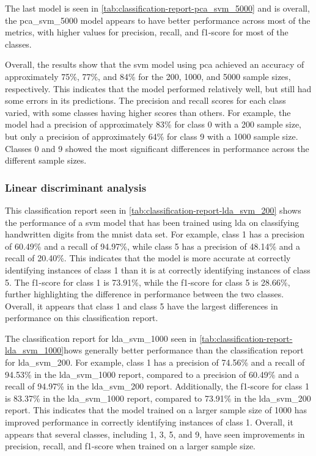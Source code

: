 The last model is seen in \autoref{tab:classification-report-pca_svm_5000} and is overall, the pca\_svm\_5000 model appears to have better performance across most of the metrics, with higher values for precision, recall, and f1-score for most of the classes.




Overall, the results show that the \gls{svm} model using \gls{pca} achieved an accuracy of approximately 75\%, 77\%, and 84\% for the 200, 1000, and 5000 sample sizes, respectively. This indicates that the model performed relatively well, but still had some errors in its predictions. The precision and recall scores for each class varied, with some classes having higher scores than others. For example, the model had a precision of approximately 83\% for class 0 with a 200 sample size, but only a precision of approximately 64\% for class 9 with a 1000 sample size. Classes 0 and 9 showed the most significant differences in performance across the different sample sizes.

\subsubsection{Linear discriminant analysis}\label{subsubsec:experiment_4_lda}




This classification report seen in \autoref{tab:classification-report-lda_svm_200} shows the performance of a \gls{svm} model that has been trained using \gls{lda} on classifying handwritten digits from the \gls{mnist} data set. For example, class 1 has a precision of 60.49\% and a recall of 94.97\%, while class 5 has a precision of 48.14\% and a recall of 20.40\%. This indicates that the model is more accurate at correctly identifying instances of class 1 than it is at correctly identifying instances of class 5. The f1-score for class 1 is 73.91\%, while the f1-score for class 5 is 28.66\%, further highlighting the difference in performance between the two classes. Overall, it appears that class 1 and class 5 have the largest differences in performance on this classification report.



The classification report for lda\_svm\_1000 seen in \autoref{tab:classification-report-lda_svm_1000}hows generally better performance than the classification report for lda\_svm\_200. For example, class 1 has a precision of 74.56\% and a recall of 94.53\% in the lda\_svm\_1000 report, compared to a precision of 60.49\% and a recall of 94.97\% in the lda\_svm\_200 report. Additionally, the f1-score for class 1 is 83.37\% in the lda\_svm\_1000 report, compared to 73.91\% in the lda\_svm\_200 report. This indicates that the model trained on a larger sample size of 1000 has improved performance in correctly identifying instances of class 1. Overall, it appears that several classes, including 1, 3, 5, and 9, have seen improvements in precision, recall, and f1-score when trained on a larger sample size.


